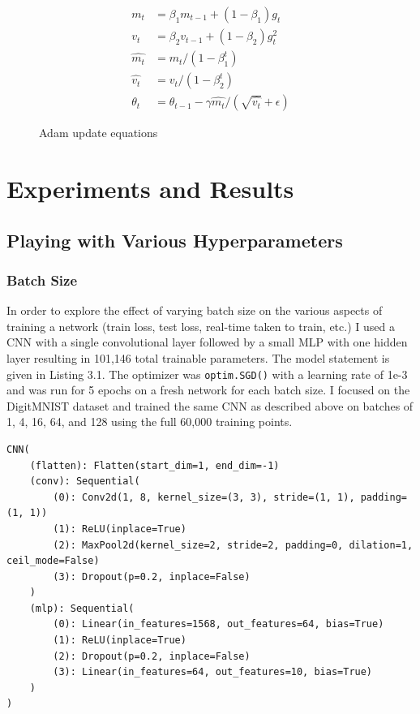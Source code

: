 \documentclass[12pt, twoside]{report}
\begin{document}
\begin{figure}[H]
    \centering
    \begin{align}
        m_t &= \beta_1 m_{t-1} + (1-\beta_1)g_t \\
        v_t &= \beta_2 v_{t-1} + (1-\beta_2)g_t^2 \\
        \widehat{m_t} &= m_t / (1-\beta_1^t) \\
        \widehat{v_t} &= v_t / (1-\beta_2^t) \\
        \theta_t &= \theta_{t-1} - \gamma \widehat{m_t} / (\sqrt{\widehat{v_t}}+\epsilon)
    \end{align}
    \caption*{Adam update equations}
\end{figure}

\chapter{Experiments and Results}

\section{Playing with Various Hyperparameters}

\subsection{Batch Size}

In order to explore the effect of varying batch size on the various aspects of training a network
(train loss, test loss, real-time taken to train, etc.) I used a CNN with a single convolutional layer
followed by a small MLP with one hidden layer resulting in 101,146 total trainable parameters.
The model statement is given in Listing 3.1.
The optimizer was \lstinline[style=inlinepython]{optim.SGD()} with a learning rate of 1e-3 and 
was run for 5 epochs on a fresh network for each batch size.
I focused on the DigitMNIST dataset and trained the same CNN as described above on batches of 
1, 4, 16, 64, and 128 using the full 60,000 training points.

\begin{lstlisting}[style=Python,caption=CNN Model,label=lst:python]
CNN(
    (flatten): Flatten(start_dim=1, end_dim=-1)
    (conv): Sequential(
        (0): Conv2d(1, 8, kernel_size=(3, 3), stride=(1, 1), padding=(1, 1))
        (1): ReLU(inplace=True)
        (2): MaxPool2d(kernel_size=2, stride=2, padding=0, dilation=1, ceil_mode=False)
        (3): Dropout(p=0.2, inplace=False)
    )
    (mlp): Sequential(
        (0): Linear(in_features=1568, out_features=64, bias=True)
        (1): ReLU(inplace=True)
        (2): Dropout(p=0.2, inplace=False)
        (3): Linear(in_features=64, out_features=10, bias=True)
    )
)
\end{lstlisting}
\end{document}
